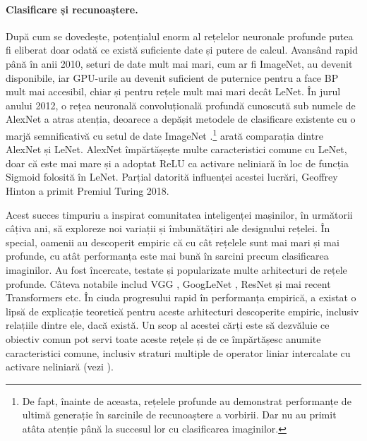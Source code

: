 \documentclass[../../book-main_ro.tex]{subfiles}
\begin{document}
\paragraph{Clasificare și recunoaștere.}
După cum se dovedește, potențialul enorm al rețelelor neuronale profunde putea fi eliberat doar odată ce există suficiente date și putere de calcul. Avansând rapid până în anii 2010, seturi de date mult mai mari, cum ar fi ImageNet, au devenit disponibile, iar GPU-urile au devenit suficient de puternice pentru a face BP mult mai accesibil, chiar și pentru rețele mult mai mari decât LeNet. În jurul anului 2012, o rețea neuronală convoluțională profundă cunoscută sub numele de AlexNet a atras atenția, deoarece a depășit metodele de clasificare existente cu o marjă semnificativă cu setul de date ImageNet \cite{krizhevsky2012imagenet}.\footnote{De fapt, înainte de aceasta, rețelele profunde au demonstrat performanțe de ultimă generație în sarcinile de recunoaștere a vorbirii. Dar nu au primit atâta atenție până la succesul lor cu clasificarea imaginilor.}  arată comparația dintre AlexNet și LeNet. AlexNet împărtășește multe caracteristici comune cu LeNet, doar că este mai mare și a adoptat ReLU ca activare neliniară în loc de funcția Sigmoid folosită în LeNet. Parțial datorită influenței acestei lucrări, Geoffrey Hinton a primit Premiul Turing 2018.


Acest succes timpuriu a inspirat comunitatea inteligenței mașinilor, în următorii câțiva ani, să exploreze noi variații și îmbunătățiri ale designului rețelei. În special, oamenii au descoperit empiric că cu cât rețelele sunt mai mari și mai profunde, cu atât performanța este mai bună în sarcini precum clasificarea imaginilor. Au fost încercate, testate și popularizate multe arhitecturi de rețele profunde. Câteva notabile includ VGG \cite{Simonyan15}, GoogLeNet \cite{Szegedy2014GoingDW}, ResNet \cite{He2016-lc} și mai recent Transformers \cite{vaswani2017attention} etc. În ciuda progresului rapid în performanța empirică, a existat o lipsă de explicație teoretică pentru aceste arhitecturi descoperite empiric, inclusiv relațiile dintre ele, dacă există. Un scop al acestei cărți este să dezvăluie ce obiectiv comun pot servi toate aceste rețele și de ce împărtășesc anumite caracteristici comune, inclusiv straturi multiple de operator liniar intercalate cu activare neliniară (vezi ).
\end{document}

